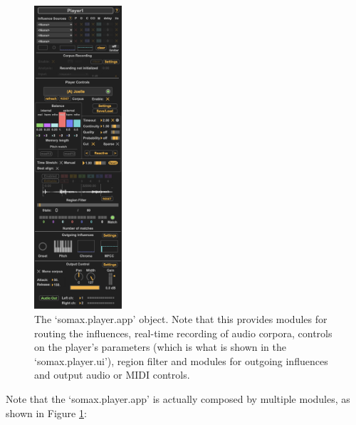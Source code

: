  \begin{figure}[H]
    \centering        
 	\includegraphics[width=0.29\textwidth, keepaspectratio]{img/player_app_audio_2-7.png}
    \caption{The `somax.player.app' object. Note that this provides modules for routing the influences, real-time recording of audio corpora, controls on the player's parameters (which is what is shown in the `somax.player.ui'), region filter and modules for outgoing influences and output audio or MIDI controls.}
    \label{fig:player_app}
\end{figure}

Note that the `somax.player.app' is actually composed by multiple modules, as shown in Figure \ref{fig:player_app}:

